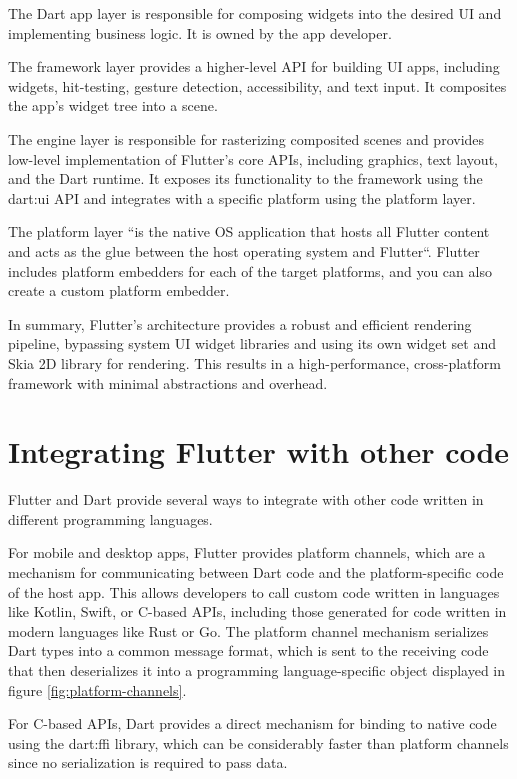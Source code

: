 \documentclass[conference]{IEEEtran}
\begin{document}
The Dart app layer is responsible for composing widgets into the desired UI and implementing business logic. It is owned by the app developer.

The framework layer provides a higher-level API for building UI apps, including widgets, hit-testing, gesture detection, accessibility, and text input. It composites the app's widget tree into a scene.

The engine layer is responsible for rasterizing composited scenes and provides low-level implementation of Flutter's core APIs, including graphics, text layout, and the Dart runtime. It exposes its functionality to the framework using the dart:ui API and integrates with a specific platform using the platform layer.

The platform layer ``is the native OS application that hosts all Flutter content and acts as the glue between the host operating system and Flutter``\cite{b1.1}. Flutter includes platform embedders for each of the target platforms, and you can also create a custom platform embedder.

In summary, Flutter's architecture provides a robust and efficient rendering pipeline, bypassing system UI widget libraries and using its own widget set and Skia 2D library \cite{b1.2} for rendering. This results in a high-performance, cross-platform framework with minimal abstractions and overhead.

\section{Integrating Flutter with other code}

Flutter and Dart provide several ways to integrate with other code written in different programming languages.

For mobile and desktop apps, Flutter provides platform channels, which are a mechanism for communicating between Dart code and the platform-specific code of the host app. This allows developers to call custom code written in languages like Kotlin, Swift, or C-based APIs, including those generated for code written in modern languages like Rust or Go. The platform channel mechanism serializes Dart types into a common message format, which is sent to the receiving code that then deserializes it into a programming language-specific object displayed in figure \ref{fig:platform-channels}. 

For C-based APIs, Dart provides a direct mechanism for binding to native code using the dart:ffi library, which can be considerably faster than platform channels since no serialization is required to pass data.
\end{document}
